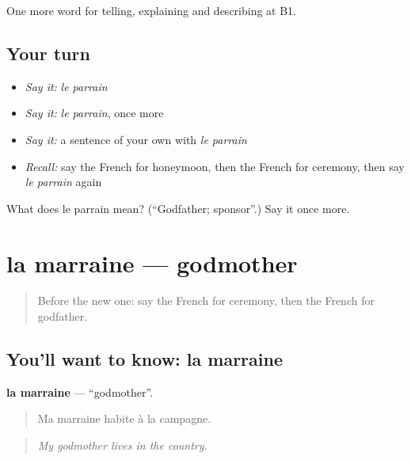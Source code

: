 \begin{grammarlens}[title={What you've built}]
One more word for telling, explaining and describing at B1.
\end{grammarlens}

\subsection*{Your turn}
\begin{itemize}
\raggedright
  \item \emph{Say it:} \emph{le parrain}
  \item \emph{Say it:} \emph{le parrain}, once more
  \item \emph{Say it:} a sentence of your own with \emph{le parrain}
  \item \emph{Recall:} say the French for honeymoon, then the French for ceremony, then say \emph{le parrain} again
\end{itemize}

\begin{tcolorbox}[breakable,colback=teal!4,colframe=teal!35!black,title={Before you move on}]
What does le parrain mean? (\textquotedblleft{}Godfather; sponsor\textquotedblright{}.) Say it once more.
\end{tcolorbox}
\section[la marraine]{la marraine — godmother}

\label{lesson:FR-C490-marraine}



\begin{quote}
Before the new one: say the French for ceremony, then the French for godfather.
\end{quote}

\subsection*{You'll want to know: la marraine}
\textbf{la marraine} — \textquotedblleft{}godmother\textquotedblright{}.

\begin{quote}
Ma marraine habite à la campagne.
\end{quote}

\begin{quote}
\emph{My godmother lives in the country.}
\end{quote}

